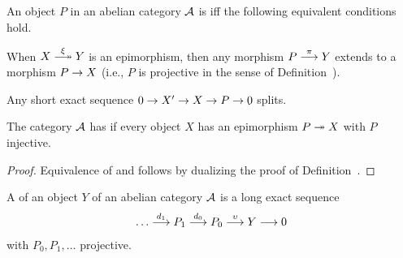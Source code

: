 \documentclass[a4paper,parskip=half,numbers=enddot, DIV=12]{scrreprt}
\begin{document}
\begin{defi}
	An object $P$ in an abelian category $\mathcal{A}$ is  iff the following equivalent conditions hold.
	\begin{alphanumerate}
		\item When $X\epimorphism[\xi] Y$ is an epimorphism, then any morphism $P\morphism[\pi] Y$ extends to a morphism $P\morphism X$ (i.e., $P$ is projective in the sense of Definition~).
		\item Any short exact sequence $0\morphism X'\morphism X\morphism P\morphism 0$ splits.
	\end{alphanumerate}
	The category $\mathcal{A}$ has  if every object $X$ has an epimorphism $P\epimorphism X$ with $P$ injective.
\end{defi}
\begin{proof}
	Equivalence of  and  follows by dualizing the proof of Definition~.
\end{proof}
\begin{defi}
	A  of an object $Y$ of an abelian category $\mathcal{A}$ is a long exact sequence
	\begin{align*}
		\ldots\morphism[d_1]P_1\morphism[d_0] P_0\morphism[\upsilon] Y\morphism 0
	\end{align*}
	with $P_0,P_1,\ldots$ projective.
\end{defi}
\end{document}
